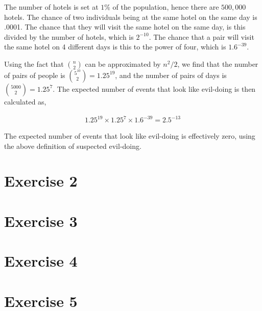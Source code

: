 \documentclass[12t]{article}
\begin{document}
	The number of hotels is set at $1\%$ of the population, hence there are $500,000$ hotels. The chance of two individuals being at the same hotel on the same day is .0001. The chance that they will visit the same hotel on the same day, is this divided by the number of hotels, which is $2^{-10}$. The chance that a pair will visit the same hotel on 4 different days is this to the power of four, which is $1.6^{-39}$. 
	
	Using the fact that ${n \choose 2}$ can be approximated by $n^2/2$, we find that the number of pairs of people is ${5^{10} \choose 2}=1.25^{19}$, and the number of pairs of days is ${5000 \choose 2}=1.25^{7}$. The expected number of events that look like evil-doing is then calculated as,
	
	\begin{align}
	1.25^{19} \times 1.25^{7} \times 1.6^{-39} = 2.5^{-13}
	\end{align}
	
	The expected number of events that look like evil-doing is effectively zero, using the above definition of suspected evil-doing. 
	
	\section*{Exercise 2}

	
	\section*{Exercise 3}

	\section*{Exercise 4}
	
	\section*{Exercise 5}


\end{document}
